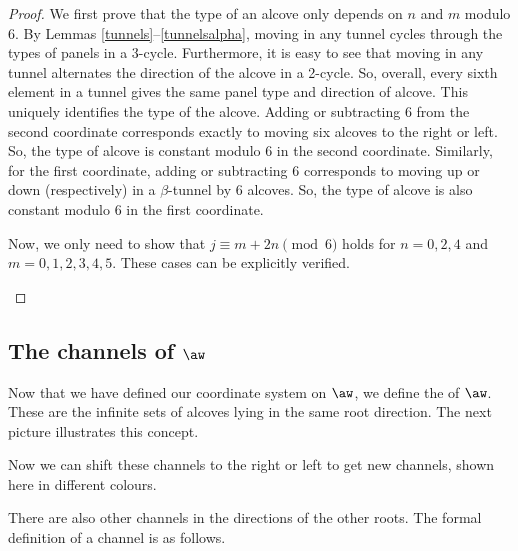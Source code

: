 \documentclass[11pt]{article}
\begin{document}
\begin{proof}
    We first prove that the type of an alcove only depends on $n$ and $m$ modulo $6$. By Lemmas \ref{tunnels}--\ref{tunnelsalpha}, moving in any tunnel cycles through the types of panels in a 3-cycle. Furthermore, it is easy to see that moving in any tunnel alternates the direction of the alcove in a 2-cycle. So, overall, every sixth element in a tunnel gives the same panel type and direction of alcove. This uniquely identifies the type of the alcove. Adding or subtracting 6 from the second coordinate corresponds exactly to moving six alcoves to the right or left. So, the type of alcove is constant modulo 6 in the second coordinate. Similarly, for the first coordinate, adding or subtracting 6 corresponds to moving up or down (respectively) in a $\beta$-tunnel by 6 alcoves. So, the type of alcove is also constant modulo 6 in the first coordinate.

Now, we only need to show that $j\equiv m+2n\pmod 6$ holds for $n=0,2,4$ and $m=0,1,2,3,4,5$. These cases can be explicitly verified. 

\begin{center}
\resizebox{0.4\textwidth}{!}{}
\end{center}
\end{proof}



\subsection{The channels of $\aw$}\label{defchannels}

Now that we have defined our coordinate system on $\aw$, we define the  of $\aw$. These are the infinite sets of alcoves lying in the same root direction. The next picture illustrates this concept. 


\begin{center}
\resizebox{0.4\textwidth}{!}{}
\end{center}

Now we can shift these channels to the right or left to get new channels, shown here in different colours.

\begin{center}
\resizebox{0.4\textwidth}{!}{}
\end{center}


There are also other channels in the directions of the other roots. The formal definition of a channel is as follows. 
\end{document}
